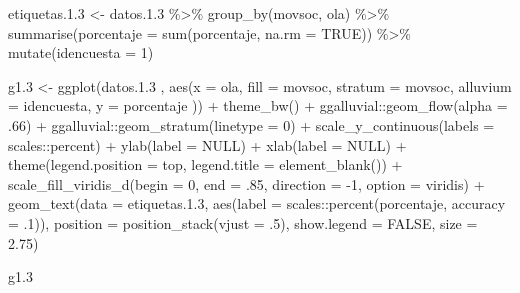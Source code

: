 \documentclass[
  12pt,
]{book}
\newenvironment{Shaded}{\begin{snugshade}}{\end{snugshade}}
\newcommand{\AttributeTok}[1]{\textcolor[rgb]{0.77,0.63,0.00}{#1}}
\newcommand{\ConstantTok}[1]{\textcolor[rgb]{0.00,0.00,0.00}{#1}}
\newcommand{\DecValTok}[1]{\textcolor[rgb]{0.00,0.00,0.81}{#1}}
\newcommand{\FloatTok}[1]{\textcolor[rgb]{0.00,0.00,0.81}{#1}}
\newcommand{\FunctionTok}[1]{\textcolor[rgb]{0.00,0.00,0.00}{#1}}
\newcommand{\NormalTok}[1]{#1}
\newcommand{\OtherTok}[1]{\textcolor[rgb]{0.56,0.35,0.01}{#1}}
\newcommand{\SpecialCharTok}[1]{\textcolor[rgb]{0.00,0.00,0.00}{#1}}
\newcommand{\StringTok}[1]{\textcolor[rgb]{0.31,0.60,0.02}{#1}}
\begin{document}
\begin{Shaded}
\begin{Highlighting}[]
\NormalTok{etiquetas.}\FloatTok{1.3} \OtherTok{\textless{}{-}}\NormalTok{ datos.}\FloatTok{1.3} \SpecialCharTok{\%\textgreater{}\%} 
  \FunctionTok{group\_by}\NormalTok{(movsoc, ola) }\SpecialCharTok{\%\textgreater{}\%} 
  \FunctionTok{summarise}\NormalTok{(}\AttributeTok{porcentaje =} \FunctionTok{sum}\NormalTok{(porcentaje, }\AttributeTok{na.rm =} \ConstantTok{TRUE}\NormalTok{)) }\SpecialCharTok{\%\textgreater{}\%} 
  \FunctionTok{mutate}\NormalTok{(}\AttributeTok{idencuesta =} \DecValTok{1}\NormalTok{)}

\NormalTok{g1}\FloatTok{.3} \OtherTok{\textless{}{-}} \FunctionTok{ggplot}\NormalTok{(datos.}\FloatTok{1.3}\NormalTok{ , }\FunctionTok{aes}\NormalTok{(}\AttributeTok{x =}\NormalTok{ ola, }\AttributeTok{fill =}\NormalTok{ movsoc, }\AttributeTok{stratum =}\NormalTok{ movsoc, }
                  \AttributeTok{alluvium =}\NormalTok{ idencuesta, }\AttributeTok{y =}\NormalTok{ porcentaje )) }\SpecialCharTok{+}
  \FunctionTok{theme\_bw}\NormalTok{() }\SpecialCharTok{+}
\NormalTok{  ggalluvial}\SpecialCharTok{::}\FunctionTok{geom\_flow}\NormalTok{(}\AttributeTok{alpha =}\NormalTok{ .}\DecValTok{66}\NormalTok{) }\SpecialCharTok{+} 
\NormalTok{  ggalluvial}\SpecialCharTok{::}\FunctionTok{geom\_stratum}\NormalTok{(}\AttributeTok{linetype =} \DecValTok{0}\NormalTok{) }\SpecialCharTok{+}
  \FunctionTok{scale\_y\_continuous}\NormalTok{(}\AttributeTok{labels =}\NormalTok{ scales}\SpecialCharTok{::}\NormalTok{percent) }\SpecialCharTok{+} 
  \FunctionTok{ylab}\NormalTok{(}\AttributeTok{label =} \ConstantTok{NULL}\NormalTok{) }\SpecialCharTok{+}
  \FunctionTok{xlab}\NormalTok{(}\AttributeTok{label =} \ConstantTok{NULL}\NormalTok{) }\SpecialCharTok{+} 
  \FunctionTok{theme}\NormalTok{(}\AttributeTok{legend.position =} \StringTok{\textquotesingle{}top\textquotesingle{}}\NormalTok{,}
        \AttributeTok{legend.title =} \FunctionTok{element\_blank}\NormalTok{()) }\SpecialCharTok{+}
  \FunctionTok{scale\_fill\_viridis\_d}\NormalTok{(}\AttributeTok{begin =} \DecValTok{0}\NormalTok{, }\AttributeTok{end =}\NormalTok{ .}\DecValTok{85}\NormalTok{, }\AttributeTok{direction =} \SpecialCharTok{{-}}\DecValTok{1}\NormalTok{, }\AttributeTok{option =} \StringTok{\textquotesingle{}viridis\textquotesingle{}}\NormalTok{) }\SpecialCharTok{+}
  \FunctionTok{geom\_text}\NormalTok{(}\AttributeTok{data =}\NormalTok{ etiquetas.}\FloatTok{1.3}\NormalTok{, }
            \FunctionTok{aes}\NormalTok{(}\AttributeTok{label =}\NormalTok{ scales}\SpecialCharTok{::}\FunctionTok{percent}\NormalTok{(porcentaje, }\AttributeTok{accuracy =}\NormalTok{ .}\DecValTok{1}\NormalTok{)),}
            \AttributeTok{position =} \FunctionTok{position\_stack}\NormalTok{(}\AttributeTok{vjust =}\NormalTok{ .}\DecValTok{5}\NormalTok{),}
            \AttributeTok{show.legend =} \ConstantTok{FALSE}\NormalTok{,}
            \AttributeTok{size =} \FloatTok{2.75}\NormalTok{)}

\NormalTok{g1}\FloatTok{.3}
\end{Highlighting}
\end{Shaded}
\end{document}
